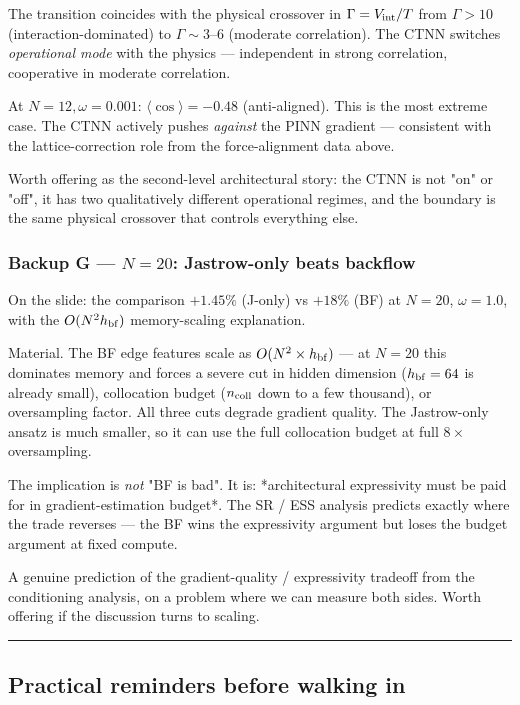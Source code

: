\documentclass[11pt]{article}
\begin{document}
The transition coincides with the physical crossover in $\Gamma = V_{\rm
int}/T$ from $\Gamma > 10$ (interaction-dominated) to $\Gamma \sim 3$--$6$
(moderate correlation). The CTNN switches \emph{operational mode} with the
physics --- independent in strong correlation, cooperative in moderate
correlation.

At $N = 12, \omega = 0.001$: $\langle \cos \rangle = -0.48$ (anti-aligned).
This is the most extreme case. The CTNN actively pushes \emph{against} the
PINN gradient --- consistent with the lattice-correction role from the
force-alignment data above.

Worth offering as the second-level architectural story: the CTNN is not
"on" or "off", it has two qualitatively different operational regimes,
and the boundary is the same physical crossover that controls everything
else.

\subsubsection*{Backup G --- $N = 20$: Jastrow-only beats backflow}

On the slide: the comparison $+1.45\%$ (J-only) vs $+18\%$ (BF) at $N =
20$, $\omega = 1.0$, with the $O(N^2 h_{\rm bf})$ memory-scaling
explanation.

Material. The BF edge features scale as $O(N^2 \times h_{\rm bf})$ --- at
$N = 20$ this dominates memory and forces a severe cut in hidden
dimension ($h_{\rm bf} = 64$ is already small), collocation budget
($n_{\rm coll}$ down to a few thousand), or oversampling factor. All
three cuts degrade gradient quality. The Jastrow-only ansatz is much
smaller, so it can use the full collocation budget at full
$8 \times$ oversampling.

The implication is \emph{not} "BF is bad". It is: *architectural expressivity
must be paid for in gradient-estimation budget*. The SR / ESS analysis
predicts exactly where the trade reverses --- the BF wins the expressivity
argument but loses the budget argument at fixed compute.

A genuine prediction of the gradient-quality / expressivity tradeoff
from the conditioning analysis, on a problem where we can measure both
sides. Worth offering if the discussion turns to scaling.

\vspace{4pt}\hrule\vspace{8pt}

\subsection*{Practical reminders before walking in}
\end{document}
